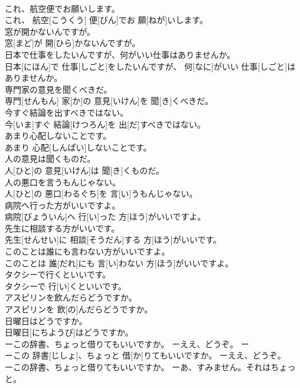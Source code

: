 \documentclass[8pt]{extreport}
\begin{document}
\begin{CJK}{UTF8}{min}
\\	これ、航空便でお願いします。	
\\	これ、 航空[こうくう] 便[びん]でお 願[ねが]いします。
\\	窓が開かないんですが。	
\\	窓[まど]が 開[ひら]かないんですが。
\\	日本で仕事をしたいんですが、何がいい仕事はありませんか。	
\\	日本[にほん]で 仕事[しごと]をしたいんですが、 何[なに]がいい 仕事[しごと]はありませんか。
\\	専門家の意見を聞くべきだ。	
\\	専門[せんもん] 家[か]の 意見[いけん]を 聞[き]くべきだ。
\\	今すぐ結論を出すべきではない。	
\\	今[いま]すぐ 結論[けつろん]を 出[だ]すべきではない。
\\	あまり心配しないことです。	
\\	あまり 心配[しんぱい]しないことです。
\\	人の意見は聞くものだ。	
\\	人[ひと]の 意見[いけん]は 聞[き]くものだ。
\\	人の悪口を言うもんじゃない。	
\\	人[ひと]の 悪口[わるぐち]を 言[い]うもんじゃない。
\\	病院へ行った方がいいですよ。	
\\	病院[びょういん]へ 行[い]った 方[ほう]がいいですよ。
\\	先生に相談する方がいいです。	
\\	先生[せんせい]に 相談[そうだん]する 方[ほう]がいいです。
\\	このことは誰にも言わない方がいいですよ。	
\\	このことは 誰[だれ]にも 言[い]わない 方[ほう]がいいですよ。
\\	タクシーで行くといいです。	
\\	タクシーで 行[い]くといいです。
\\	アスピリンを飲んだらどうですか。	
\\	アスピリンを 飲[の]んだらどうですか。
\\	日曜日はどうですか。	
\\	日曜日[にちようび]はどうですか。
\\	ーこの辞書、ちょっと借りてもいいですか。 ーええ、どうぞ。	ー
\\	ーこの 辞書[じしょ]、ちょっと 借[か]りてもいいですか。 ーええ、どうぞ。
\\	ーこの辞書、ちょっと借りてもいいですか。 ーあ、すみません。それはちょっと。	

\end{CJK}
\end{document}
